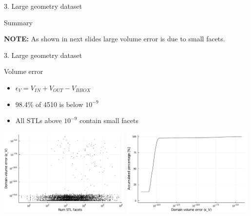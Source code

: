 \documentclass{beamer}
\begin{document}
\begin{frame}{3. Large geometry dataset}
  \begin{block}{Summary}

  \end{block}

  \vfill{}

  \textbf{NOTE:} As shown in next slides large volume error is due to small facets.

\end{frame}


\begin{frame}{3. Large geometry dataset}



  \begin{block}{Volume error}
  \begin{itemize}
    \item
      $\epsilon_V = V_{IN} + V_{OUT} - V_{BBOX}$
    \item
      98.4\% of 4510 is below $10^{-9}$
    \item
      All STLs above $10^{-9}$ contain small facets
  \end{itemize}
  \end{block}

  \includegraphics[width=0.49\textwidth]{../analysis/plots/num_stl_facets_volume_error}
  \includegraphics[width=0.49\textwidth]{../analysis/plots/histogram_volume_error}
\end{frame}
\end{document}
